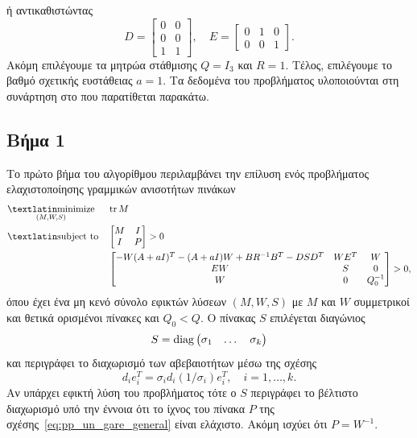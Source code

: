 ή αντικαθιστώντας
\[
    D =
    \begin{bmatrix}
        0 & 0 \\
        0 & 0 \\
        1 & 1
    \end{bmatrix}, \quad
    E =
    \begin{bmatrix}
        0 & 1 & 0 \\
        0 & 0 & 1
    \end{bmatrix}.
\]
Ακόμη επιλέγουμε τα μητρώα στάθμισης \( Q = I_3 \) και \( R = 1 \). Τέλος,
επιλέγουμε το βαθμό σχετικής ευστάθειας \( a = 1 \). Τα δεδομένα του
προβλήματος υλοποιούνται στη συνάρτηση  στο  που
παρατίθεται παρακάτω.
\eng{}

\subsection{Βήμα 1}
Το πρώτο βήμα του αλγορίθμου περιλαμβάνει την επίλυση ενός προβλήματος
ελαχιστοποίησης γραμμικών ανισοτήτων πινάκων
\begin{equation*}
    \begin{aligned}
        & \underset{
            (M, W, S)
        }{\mathtxt{minimize}}
        & & \tr M \\
        & \mathtxt{subject to}
        & &
        \begin{bmatrix}
            M & I \\
            I & P
        \end{bmatrix} > 0 \\
        &&&
        \begin{bmatrix}
            -W(A + aI)^T - (A + aI)W + BR^{-1}B^T
            - DSD^T & WE^T & W \\
            EW & S & 0 \\
            W & 0 & Q_0^{-1}\\
        \end{bmatrix} > 0,
    \end{aligned}
\end{equation*}
όπου έχει ένα μη κενό σύνολο εφικτών λύσεων \( (M, W, S) \) με \( M \) και
\( W \) συμμετρικοί και θετικά ορισμένοι πίνακες και \( Q_0 < Q \). Ο πίνακας
\( S \) επιλέγεται διαγώνιος
\[
    S = \operatorname{diag}\begin{pmatrix} \sigma_1 & \dots & \sigma_k\end{pmatrix}
\]
και περιγράφει το διαχωρισμό των αβεβαιοτήτων μέσω της σχέσης
\begin{equation}\label{eq:pp_sep}
    d_ie_i^T = \sigma_i d_i (1/\sigma_i)e_i^T, \quad i = 1, \dots ,k.
\end{equation}
Αν υπάρχει εφικτή λύση του προβλήματος τότε ο \( S \) περιγράφει το βέλτιστο
διαχωρισμό υπό την έννοια ότι το ίχνος του πίνακα \( P \) της
σχέσης~\eqref{eq:pp_un_gare_general} είναι ελάχιστο. Ακόμη ισχύει ότι
\( P = W^{-1} \).

